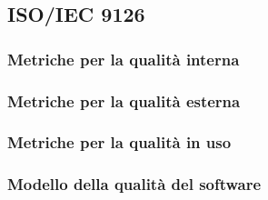 \subsection{ISO/IEC 9126}
	\subsubsection{Metriche per la qualità interna}
	\subsubsection{Metriche per la qualità esterna}
	\subsubsection{Metriche per la qualità in uso}
	\subsubsection{Modello della qualità del software}